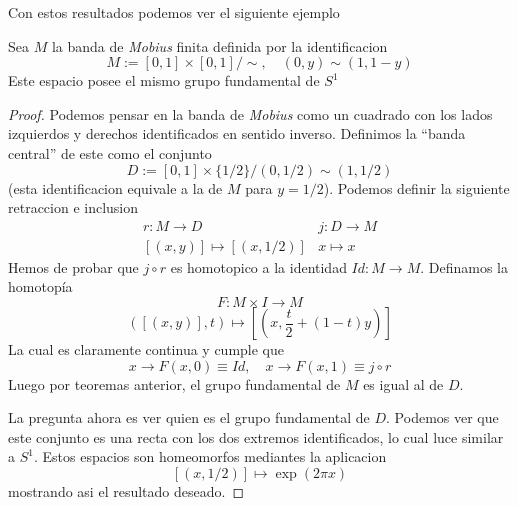 Con estos resultados podemos ver el siguiente ejemplo
\begin{corolario} \label{ex:mobius}
  Sea \(M\) la banda de \emph{Mobius} finita definida por la identificacion
  \[ M := [0,1] \times [0,1] / \sim, \quad (0,y) \sim (1, 1 - y) \]
  Este espacio posee el mismo grupo fundamental de \(S^1\)
\end{corolario}
\begin{proof}
  Podemos pensar en la banda de \emph{Mobius} como un cuadrado con los
  lados izquierdos y derechos identificados en sentido inverso.
  Definimos la ``banda central'' de este como el conjunto
  \[ D := [0,1] \times \{1 / 2\} / (0, 1 / 2) \sim (1,1 / 2) \]
  (esta identificacion equivale a la de \(M\) para \(y = 1/2\)). Podemos
  definir la siguiente retraccion e inclusion
  \[
    \begin{matrix}
      r : M \to D & j : D \to M \\
      [(x,y)] \mapsto [(x, 1/2)] & x \mapsto x
    \end{matrix}
  \]
  Hemos de probar que \(j \circ r\) es homotopico a la identidad \(Id
  : M \to M\). Definamos la homotopía
  \[ F : M \times I \to M \]
  \[ ([(x,y)], t) \mapsto [(x, \frac t 2 + (1-t) y)] \]
  La cual es claramente continua y cumple que
  \[ x \to F(x,0) \equiv Id,\quad x \to F(x,1) \equiv j \circ r\]
  Luego por teoremas anterior, el grupo fundamental de
  \(M\) es igual al de \(D\).

  La pregunta ahora es ver quien es el grupo fundamental de \(D\).
  Podemos ver que este conjunto es una recta con los dos extremos
  identificados, lo cual luce similar a \(S^1\). Estos espacios son
  homeomorfos mediantes la aplicacion
  \[[(x, 1/2)] \mapsto \exp (2 \pi x)\]
  mostrando asi el resultado deseado.
\end{proof}

